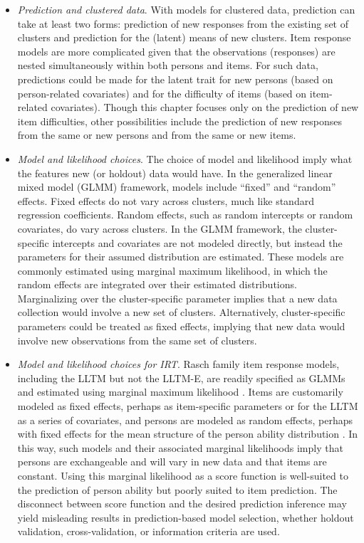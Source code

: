 \begin{itemize}
	\item \emph{Prediction and clustered data}. With models for clustered data, prediction can take at least two forms: prediction of new responses from the existing set of clusters and prediction for the (latent) means of new clusters. Item response models are more complicated given that the observations (responses) are nested simultaneously within both persons and items. For such data, predictions could be made for the latent trait for new persons (based on person-related covariates) and for the difficulty of items (based on item-related covariates). Though this chapter focuses only on the prediction of new item difficulties, other possibilities include the prediction of new responses from the same or new persons and from the same or new items.
	
	\item \emph{Model and likelihood choices}. The choice of model and likelihood imply what the features new (or holdout) data would have. In the generalized linear mixed model (GLMM) framework, models include ``fixed'' and ``random'' effects. Fixed effects do not vary across clusters, much like standard regression coefficients. Random effects, such as random intercepts or random covariates, do vary across clusters. In the GLMM framework, the cluster-specific intercepts and covariates are not modeled directly, but instead the parameters for their assumed distribution are estimated. These models are commonly estimated using marginal maximum likelihood, in which the random effects are integrated over their estimated distributions. Marginalizing over the cluster-specific parameter implies that a new data collection would involve a new set of clusters. Alternatively, cluster-specific parameters could be treated as fixed effects, implying that new data would involve new observations from the same set of clusters.
	
	\item \emph{Model and likelihood choices for IRT}. Rasch family item response models, including the LLTM but not the LLTM-E, are readily specified as GLMMs \parencite{Rijmen2003} and estimated using marginal maximum likelihood \parencite{Bock1981}. Items are customarily modeled as fixed effects, perhaps as item-specific parameters or for the LLTM as a series of covariates, and persons are modeled as random effects, perhaps with fixed effects for the mean structure of the person ability distribution \parencite[for example,][]{Adams1997b}. In this way, such models and their associated marginal likelihoods imply that persons are exchangeable and will vary in new data and that items are constant. Using this marginal likelihood as a score function is well-suited to the prediction of person ability but poorly suited to item prediction. The disconnect between score function and the desired prediction inference may yield misleading results in prediction-based model selection, whether holdout validation, cross-validation, or information criteria are used.
	

\end{itemize}
